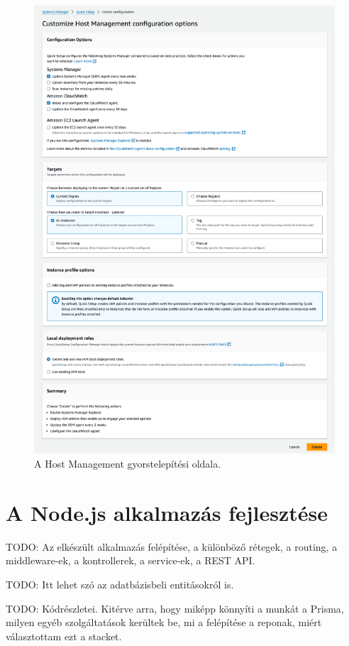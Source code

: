 \begin{figure}[ht]
  \centering
  \includegraphics[width=152mm, keepaspectratio]{figures/hostmgmt.png}
  \caption{A Host Management gyorstelepítési oldala.}
  \label{fig:hostmgmt}
\end{figure}

\section{A Node.js alkalmazás fejlesztése}

TODO: Az elkészült alkalmazás felépítése, a különböző rétegek, a routing, a middleware-ek, a kontrollerek, a service-ek, a REST API.

TODO: Itt lehet szó az adatbázisbeli entitásokról is.

TODO: Kódrészletei. Kitérve arra, hogy miképp könnyíti a munkát a Prisma, milyen egyéb szolgáltatások kerültek be, mi a felépítése a reponak, miért választottam ezt a stacket.

